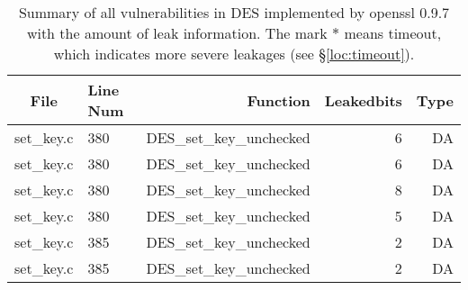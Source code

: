 \begin{table}%
\centering\tiny
\caption{Summary of all vulnerabilities in DES implemented by openssl 0.9.7 with the amount of leak information. The mark $*$ means timeout, which indicates more severe leakages (see \S\ref{loc:timeout}).}\label{tab:DESopenssl}
\begin{tabular}{clrrr}
\hline
\textbf{File} & \textbf{Line Num} & \textbf{Function} & \textbf{Leakedbits} & \textbf{Type} \\\hline
set\_key.c& 380&DES\_set\_key\_unchecked&6 &DA\\
set\_key.c& 380&DES\_set\_key\_unchecked&6 &DA\\
set\_key.c& 380&DES\_set\_key\_unchecked&8 &DA\\
set\_key.c& 380&DES\_set\_key\_unchecked&5 &DA\\
set\_key.c& 385&DES\_set\_key\_unchecked&2 &DA\\
set\_key.c& 385&DES\_set\_key\_unchecked&2 &DA\\
\hline
\end{tabular}
\end{table}